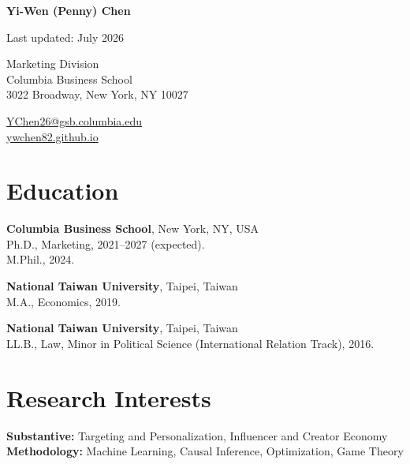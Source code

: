 \documentclass[12pt, letterpaper]{article}
\newenvironment{cvblock}{%
  \begin{list}{}{%
    \setlength{\leftmargin}{0.35in}%
    \setlength{\rightmargin}{0pt}%
    \setlength{\topsep}{2pt}%
    \setlength{\parsep}{0pt}%
    \setlength{\itemsep}{0pt}%
    \setlength{\partopsep}{0pt}%
  }%
  \item[]%
}{%
  \end{list}%
}
\begin{document}
\thispagestyle{firstpage}

\begin{minipage}[b]{0.70\textwidth}
{\LARGE\bfseries Yi-Wen (Penny) Chen}
\end{minipage}%
\hfill
\begin{minipage}[b]{0.28\textwidth}\raggedleft
\footnotesize Last updated: July 2026
\end{minipage}

\vspace{16pt}

\begin{minipage}[t]{0.55\textwidth}
Marketing Division\\
Columbia Business School\\
3022 Broadway, New York, NY 10027
\end{minipage}%
\hfill
\begin{minipage}[t]{0.40\textwidth}\raggedright
\href{mailto:YChen26@gsb.columbia.edu}{YChen26@gsb.columbia.edu}\\[2pt]
\href{https://ywchen82.github.io}{ywchen82.github.io}
\end{minipage}

\vspace{4pt}

\section{Education}
\begin{cvblock}
\textbf{Columbia Business School}, New York, NY, USA\\
Ph.D., Marketing, 2021--2027 (expected).\\
M.Phil., 2024.

\medskip
\textbf{National Taiwan University}, Taipei, Taiwan\\
M.A., Economics, 2019.

\medskip
\textbf{National Taiwan University}, Taipei, Taiwan\\
LL.B., Law, Minor in Political Science (International Relation Track), 2016.
\end{cvblock}

\section{Research Interests}
\begin{cvblock}
\textbf{Substantive:} Targeting and Personalization, Influencer and Creator Economy\\[4pt]
\textbf{Methodology:} Machine Learning, Causal Inference, Optimization, Game Theory
\end{cvblock}
\end{document}
